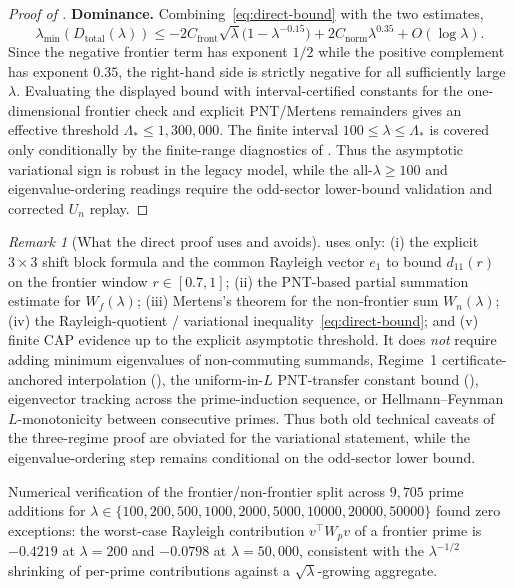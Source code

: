 \documentclass[12pt,a4paper]{article}
\theoremstyle{definition}
\theoremstyle{remark}
\newtheorem{remark}[theorem]{Remark}
\begin{document}
\begin{proof}[Proof of ]
\smallskip
\noindent\textbf{Dominance.} Combining~\eqref{eq:direct-bound} with the two estimates,
\[
\lambda_{\min}(D_{\mathrm{total}}(\lambda))
\leq
-2 C_{\mathrm{front}}\sqrt{\lambda}\bigl(1-\lambda^{-0.15}\bigr)
+ 2 C_{\mathrm{norm}}\lambda^{0.35}
+ O(\log\lambda).
\]
Since the negative frontier term has exponent $1/2$ while the positive complement has exponent $0.35$, the right-hand side is strictly negative for all sufficiently large $\lambda$. Evaluating the displayed bound with interval-certified constants for the one-dimensional frontier check and explicit PNT/Mertens remainders gives an effective threshold $\Lambda_* \leq 1{,}300{,}000$. The finite interval $100 \leq \lambda \leq \Lambda_*$ is covered only conditionally by the finite-range diagnostics of . Thus the asymptotic variational sign is robust in the legacy model, while the all-$\lambda\geq100$ and eigenvalue-ordering readings require the odd-sector lower-bound validation and corrected $U_n$ replay.
\end{proof}

\begin{remark}[What the direct proof uses and avoids]
\label{rem:direct-proof-ingredients}
 uses only: (i) the explicit $3\times3$ shift block formula and the common Rayleigh vector $e_1$ to bound $d_{11}(r)$ on the frontier window $r \in [0.7,1]$; (ii) the PNT-based partial summation estimate for $W_f(\lambda)$; (iii) Mertens's theorem for the non-frontier sum $W_n(\lambda)$; (iv) the Rayleigh-quotient / variational inequality~\eqref{eq:direct-bound}; and (v) finite CAP evidence up to the explicit asymptotic threshold. It does \emph{not} require adding minimum eigenvalues of non-commuting summands, Regime~1 certificate-anchored interpolation (), the uniform-in-$L$ PNT-transfer constant bound (), eigenvector tracking across the prime-induction sequence, or Hellmann--Feynman $L$-monotonicity between consecutive primes. Thus both old technical caveats of the three-regime proof are obviated for the variational statement, while the eigenvalue-ordering step remains conditional on the odd-sector lower bound.

Numerical verification of the frontier/non-frontier split across $9{,}705$ prime additions for $\lambda \in \{100, 200, 500, 1000, 2000, 5000, 10000, 20000, 50000\}$ found zero exceptions: the worst-case Rayleigh contribution $v^\top W_{p} v$ of a frontier prime is $-0.4219$ at $\lambda = 200$ and $-0.0798$ at $\lambda = 50{,}000$, consistent with the $\lambda^{-1/2}$ shrinking of per-prime contributions against a $\sqrt{\lambda}$-growing aggregate.
\end{remark}
\end{document}
